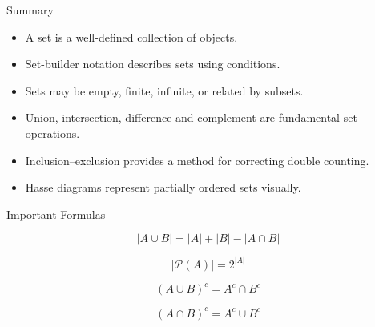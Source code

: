 \documentclass[aspectratio=169,11pt]{beamer}
\begin{document}
\begin{frame}{Summary}

\begin{itemize}

\item A set is a well-defined collection of objects.

\vspace{0.12cm}

\item Set-builder notation describes sets using conditions.

\vspace{0.12cm}

\item Sets may be empty, finite, infinite, or related by
subsets.

\vspace{0.12cm}

\item Union, intersection, difference and complement are
fundamental set operations.

\vspace{0.12cm}

\item Inclusion--exclusion provides a method for correcting
double counting.

\vspace{0.12cm}

\item Hasse diagrams represent partially ordered sets
visually.

\end{itemize}

\end{frame}


\begin{frame}{Important Formulas}

\begin{center}

\[
\boxed{
|A\cup B|
=
|A|+|B|-|A\cap B|
}
\]

\vspace{0.18cm}

\[
\boxed{
|\mathcal P(A)|=2^{|A|}
}
\]

\vspace{0.18cm}

\[
\boxed{
(A\cup B)^c=A^c\cap B^c
}
\]

\vspace{0.18cm}

\[
\boxed{
(A\cap B)^c=A^c\cup B^c
}
\]

\end{center}

\end{frame}
\end{document}
